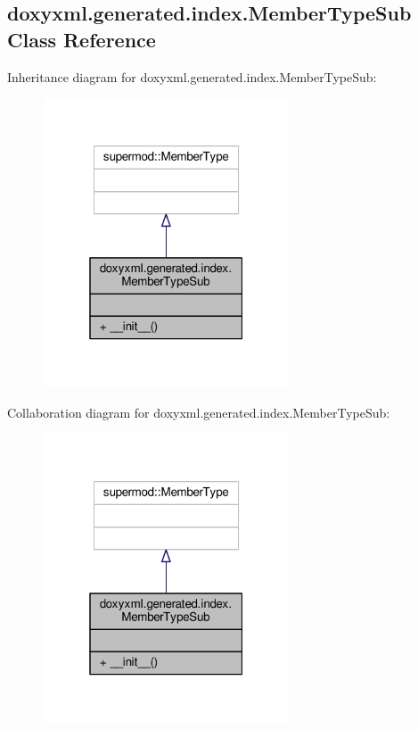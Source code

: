 \subsection{doxyxml.\+generated.\+index.\+Member\+Type\+Sub Class Reference}
\label{classdoxyxml_1_1generated_1_1index_1_1MemberTypeSub}


Inheritance diagram for doxyxml.\+generated.\+index.\+Member\+Type\+Sub\+:
\nopagebreak
\begin{figure}[H]
\begin{center}
\leavevmode
\includegraphics[width=208pt]{d5/d83/classdoxyxml_1_1generated_1_1index_1_1MemberTypeSub__inherit__graph}
\end{center}
\end{figure}


Collaboration diagram for doxyxml.\+generated.\+index.\+Member\+Type\+Sub\+:
\nopagebreak
\begin{figure}[H]
\begin{center}
\leavevmode
\includegraphics[width=208pt]{d0/d81/classdoxyxml_1_1generated_1_1index_1_1MemberTypeSub__coll__graph}
\end{center}
\end{figure}

